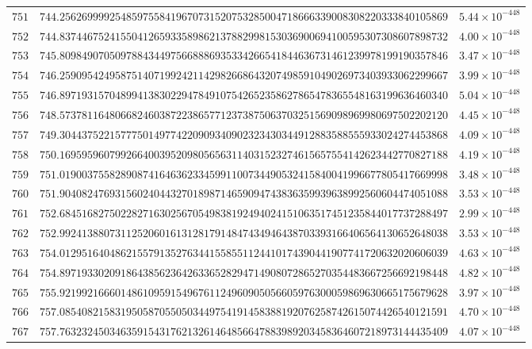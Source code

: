 \documentclass[12pt,reqno]{amsart}
\theoremstyle{remark}
\begin{document}
\begin{longtable}{clc}
$751$ & $744.2562699992548597558419670731520753285004718666339008308220333840105869$ & $5.44\times 10^{-448}$ \\
$752$ & $744.8374467524155041265933589862137882998153036900694100595307308607898732$ & $4.00\times 10^{-448}$ \\
$753$ & $745.8098490705097884344975668886935334266541844636731461239978199190357846$ & $3.47\times 10^{-448}$ \\
$754$ & $746.2590954249587514071992421142982668643207498591049026973403933062299667$ & $3.99\times 10^{-448}$ \\
$755$ & $746.8971931570489941383022947849107542652358627865478365548163199636460340$ & $5.04\times 10^{-448}$ \\
$756$ & $748.5737811648066824603872238657712373875063703251569098969980697502202120$ & $4.45\times 10^{-448}$ \\
$757$ & $749.3044375221577750149774220909340902323430344912883588555933024274453868$ & $4.09\times 10^{-448}$ \\
$758$ & $750.1695959607992664003952098056563114031523274615657554142623442770827188$ & $4.19\times 10^{-448}$ \\
$759$ & $751.0190037558289087416463623345991100734490532415840041996677805417669998$ & $3.48\times 10^{-448}$ \\
$760$ & $751.9040824769315602404432701898714659094743836359939638992560604474051088$ & $3.53\times 10^{-448}$ \\
$761$ & $752.6845168275022827163025670549838192494024151063517451235844017737288497$ & $2.99\times 10^{-448}$ \\
$762$ & $752.9924138807311252060161312817914847434946438703393166406564130652648038$ & $3.53\times 10^{-448}$ \\
$763$ & $754.0129516404862155791352763441558551124410174390441907741720632020606039$ & $4.63\times 10^{-448}$ \\
$764$ & $754.8971933020918643856236426336528294714908072865270354483667256692198448$ & $4.82\times 10^{-448}$ \\
$765$ & $755.9219921666014861095915496761124960905056605976300059869630665175679628$ & $3.97\times 10^{-448}$ \\
$766$ & $757.0854082158319505870550503449754191458388192076258742615074426540121591$ & $4.70\times 10^{-448}$ \\
$767$ & $757.7632324503463591543176213261464856647883989203458364607218973144435409$ & $4.07\times 10^{-448}$ \\

\end{longtable}
\end{document}
